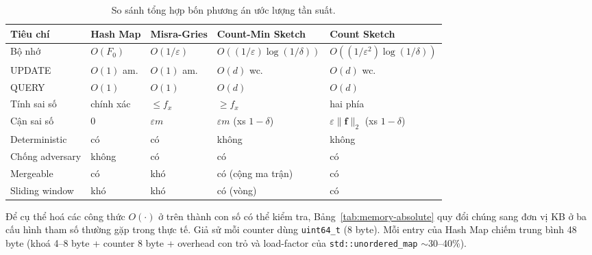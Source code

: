 \begin{table}[H]
  \centering
  \caption{So sánh tổng hợp bốn phương án ước lượng tần suất.}
  \label{tab:compare-summary}
  \footnotesize
  \begin{tabularx}{\linewidth}{@{}l >{\raggedright\arraybackslash}X >{\raggedright\arraybackslash}X >{\raggedright\arraybackslash}X >{\raggedright\arraybackslash}X@{}}
    \toprule
    \textbf{Tiêu chí} & \textbf{Hash Map} & \textbf{Misra-Gries} & \textbf{Count-Min Sketch} & \textbf{Count Sketch} \\
    \midrule
    Bộ nhớ        & $O(F_0)$   & $O(1/\varepsilon)$ & $O((1/\varepsilon)\log(1/\delta))$ & $O((1/\varepsilon^2)\log(1/\delta))$ \\
    UPDATE        & $O(1)$ am. & $O(1)$ am.         & $O(d)$ wc.                         & $O(d)$ wc. \\
    QUERY         & $O(1)$     & $O(1)$             & $O(d)$                             & $O(d)$ \\
    Tính sai số   & chính xác  & $\le f_x$          & $\ge f_x$                          & hai phía \\
    Cận sai số    & $0$        & $\varepsilon m$    & $\varepsilon m$ (xs $1-\delta$)    & $\varepsilon \|\mathbf{f}\|_2$ (xs $1-\delta$) \\
    Deterministic & có         & có                 & không                              & không \\
    Chống adversary & không    & có                 & có                                 & có \\
    Mergeable     & có         & khó                & có (cộng ma trận)                  & có \\
    Sliding window & khó       & khó                & có (vòng)                          & có \\
    \bottomrule
  \end{tabularx}
\end{table}

Để cụ thể hoá các công thức $O(\cdot)$ ở trên thành con số có thể kiểm tra, Bảng~\ref{tab:memory-absolute} quy đổi chúng sang đơn vị KB ở ba cấu hình tham số thường gặp trong thực tế. Giả sử mỗi counter dùng \texttt{uint64\_t} (8 byte). Mỗi entry của Hash Map chiếm trung bình 48 byte (khoá 4--8 byte + counter 8 byte + overhead con trỏ và load-factor của \texttt{std::unordered\_map} $\sim$30--40\%).

